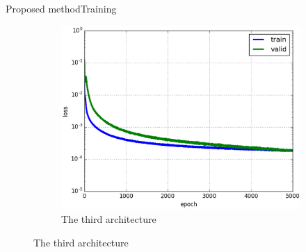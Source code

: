 \documentclass[10pt]{beamer}
\begin{document}
\begin{frame}{Proposed method}{Training}
\begin{figure}[htbp]
\begin{subfigure}[t]{0.5\textwidth}
        			\includegraphics[scale=.22]{images/loss_model_3}
        			\caption{\scriptsize{The third architecture }}
        			\label{figsub22}
    			\end{subfigure}    		
			\end{figure}
\end{frame}

\end{document}
